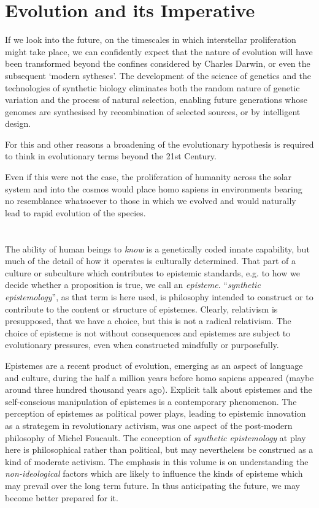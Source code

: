 \section{Evolution and its Imperative}

If we look into the future, on the timescales in which interstellar proliferation might take place, we can confidently expect that the nature of evolution will have been transformed beyond the confines considered by Charles Darwin, or even the subsequent `modern sytheses'.
The development of the science of genetics and the technologies of synthetic biology eliminates both the random nature of genetic variation and the process of natural selection, enabling future generations whose genomes are synthesised by recombination of selected sources, or by intelligent design.

For this and other reasons a broadening of the evolutionary hypothesis is required to think in evolutionary terms beyond the 21st Century.

Even if this were not the case, the proliferation of humanity across the solar system and into the cosmos would place homo sapiens in environments bearing no resemblance whatsoever to those in which we evolved and would naturally lead to rapid evolution of the species.




\section{}

The ability of human beings to \emph{know} is a genetically coded innate capability, but much of the detail of how it operates is culturally determined.
That part of a culture or subculture which contributes to epistemic standards, e.g. to how we decide whether a proposition is true, we call an \emph{episteme}.
``\emph{synthetic epistemology}'', as that term is here used, is philosophy intended to construct or to contribute to the content or structure of epistemes.
Clearly, relativism is presupposed, that we have a choice, but this is not a radical relativism.
The choice of episteme is not without consequences and epistemes are subject to evolutionary pressures, even when constructed mindfully or purposefully.

Epistemes are a recent product of evolution, emerging as an aspect of language and culture, during the half a million years before homo sapiens appeared (maybe around three hundred thousand years ago).
Explicit talk about epistemes and the self-conscious manipulation of epistemes is a contemporary phenomenon.
The perception of epistemes as political power plays, leading to epistemic innovation as a strategem in revolutionary activism, was one aspect of the post-modern philosophy of  Michel Foucault.
The conception of \emph{synthetic epistemology} at play here is philosophical rather than political, but may nevertheless be construed as a kind of moderate activism.
The emphasis in this volume is on understanding the \emph{non-ideological} factors which are likely to influence the kinds of episteme which may prevail over the long term future.
In thus anticipating the future, we may become better prepared for it.

